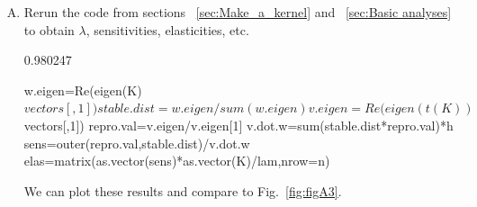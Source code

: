 \documentclass[11pt]{article}
\begin{document}
\begin{enumerate}[(A)]
\item Rerun the code from sections ~\ref{sec:Make_a_kernel} and ~\ref{sec:Basic analyses} to obtain $\lambda$,  sensitivities, elasticities, etc.
\begin{Schunk}
\begin{Soutput}
[1] 0.980247
\end{Soutput}
\begin{Sinput}
 w.eigen=Re(eigen(K)$vectors[,1])
 stable.dist=w.eigen/sum(w.eigen) 
 v.eigen=Re(eigen(t(K))$vectors[,1])
 repro.val=v.eigen/v.eigen[1] 
 v.dot.w=sum(stable.dist*repro.val)*h
 sens=outer(repro.val,stable.dist)/v.dot.w
 elas=matrix(as.vector(sens)*as.vector(K)/lam,nrow=n)
\end{Sinput}
\end{Schunk}

We can plot these results and compare to Fig.~\ref{fig:figA3}.


\end{enumerate}
\end{document}
